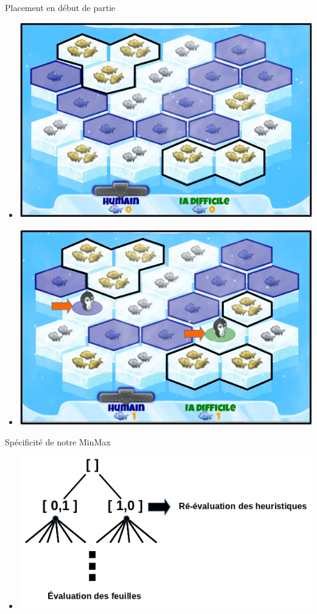 \documentclass{beamer}
\begin{document}
\begin{frame}{}
\begin{block}{Placement en début de partie}
\begin{itemize}
 \item<1->\includegraphics[scale=0.2]{IA1}
 \item<2->\includegraphics[scale=0.2]{IA2}
\end{itemize}
\end{block}
\end{frame}

\begin{frame}{}
\begin{block}{Spécificité de notre MinMax}
\begin{itemize}
 \item{
  \includegraphics[scale=0.4]{IA4}}
\end{itemize}
\end{block}
\end{frame}
\end{document}
